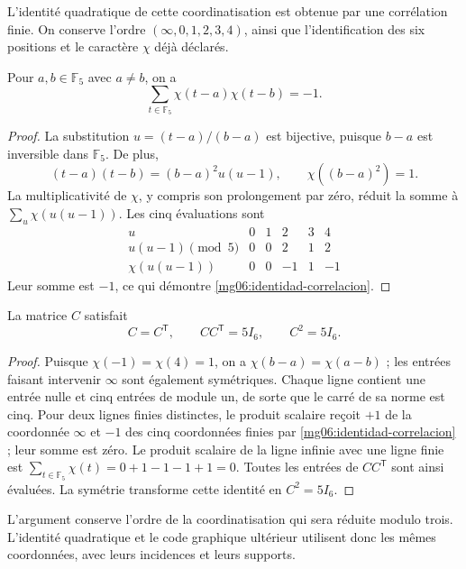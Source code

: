 L'identité quadratique de cette coordinatisation est obtenue par une
corrélation finie. On conserve l'ordre
\((\infty,0,1,2,3,4)\), ainsi que l'identification des six
positions et le caractère \(\chi\) déjà déclarés.

\begin{lemma}
\label{mg06:correlacion}
Pour \(a,b\in\mathbb F_5\) avec \(a\ne b\), on a
\begin{equation}
 \sum_{t\in\mathbb F_5}\chi(t-a)\chi(t-b)=-1.
 \label{mg06:identidad-correlacion}
\end{equation}
\end{lemma}
\begin{proof}
La substitution \(u=(t-a)/(b-a)\) est bijective, puisque \(b-a\) est
inversible dans \(\mathbb F_5\). De plus,
\[
 (t-a)(t-b)=(b-a)^2u(u-1),\qquad
 \chi((b-a)^2)=1.
\]
La multiplicativité de \(\chi\), y compris son prolongement par zéro, réduit la somme à \(\sum_u\chi(u(u-1))\). Les cinq évaluations sont
\begin{equation}
\begin{array}{c|rrrrr}
 u&0&1&2&3&4\\\hline
 u(u-1)\pmod5&0&0&2&1&2\\
 \chi(u(u-1))&0&0&-1&1&-1
\end{array}
\label{mg06:cinco-evaluaciones}
\end{equation}
Leur somme est \(-1\), ce qui démontre
\eqref{mg06:identidad-correlacion}.
\end{proof}

\begin{proposition}
\label{mg06:conferencia}
La matrice \(C\) satisfait
\begin{equation}
 C=C^{\mathsf T},\qquad CC^{\mathsf T}=5I_6,
 \qquad C^2=5I_6.
 \label{mg06:identidad-conferencia}
\end{equation}
\end{proposition}
\begin{proof}
Puisque \(\chi(-1)=\chi(4)=1\), on a \(\chi(b-a)=\chi(a-b)\) ; les entrées faisant intervenir \(\infty\) sont également symétriques. Chaque ligne contient une entrée nulle et cinq entrées de module un, de sorte que le carré de sa norme est cinq. Pour deux lignes finies distinctes, le produit scalaire reçoit \(+1\) de la coordonnée \(\infty\) et \(-1\) des cinq coordonnées finies par \eqref{mg06:identidad-correlacion} ; leur somme est zéro. Le produit scalaire de la ligne infinie avec une ligne finie est \(\sum_{t\in\mathbb F_5}\chi(t)=0+1-1-1+1=0\). Toutes les entrées de \(CC^{\mathsf T}\) sont ainsi évaluées. La symétrie transforme cette identité en \(C^2=5I_6\).
\end{proof}

L'argument conserve l'ordre de la coordinatisation qui sera réduite modulo
trois. L'identité quadratique et le code graphique ultérieur
utilisent donc les mêmes coordonnées, avec leurs incidences et leurs supports.
